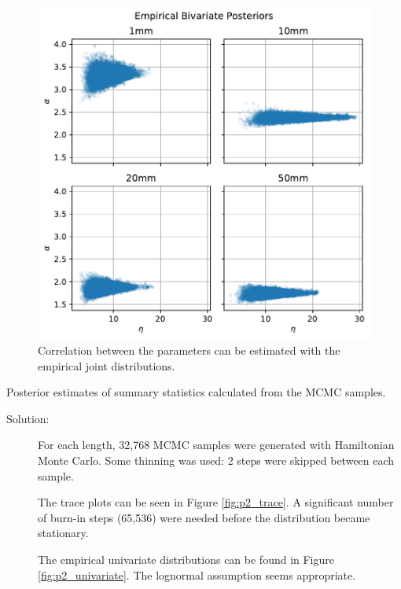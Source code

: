 \documentclass[letterpaper,11pt]{article}
\begin{document}
\begin{enumerate}
\begin{enumerate}
    \begin{figure}
      \centering
      \includegraphics{p2_bivariate.pdf}
      \caption{Correlation between the parameters can be estimated with
        the empirical joint distributions.}
      \label{fig:p2_bivariate}
    \end{figure}

    \begin{table}
      \scriptsize
      \centering
      
      \caption{Posterior estimates of summary statistics calculated from the
        MCMC samples.}
      \label{tab:p2_summary}
    \end{table}
    
    \begin{description}
    \item[Solution:] For each length, 32,768 MCMC samples were generated with
      Hamiltonian Monte Carlo. Some thinning was used: 2 steps were skipped
      between each sample.

      The trace plots can be seen in Figure \ref{fig:p2_trace}. A significant
      number of burn-in steps (65,536) were needed before the distribution
      became stationary.

      The empirical univariate distributions can be found in Figure
      \ref{fig:p2_univariate}. The lognormal assumption seems appropriate.


\end{description}
\end{enumerate}
\end{enumerate}
\end{document}
